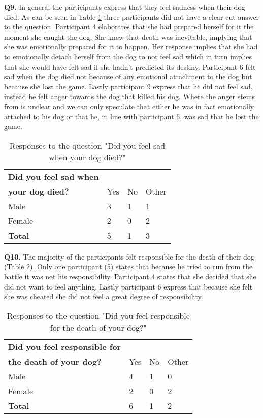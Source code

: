 \textbf{Q9.} In general the participants express that they feel sadness when their dog died. As can be seen in Table \ref{tab:sad} three participants did not have a clear cut answer to the question. Participant 4 elaborates that she had prepared herself for it the moment she caught the dog. She knew that death was inevitable, implying that she was emotionally prepared for it to happen. Her response implies that she had to emotionally detach herself from the dog to not feel sad which in turn implies that she would have felt sad if she hadn't predicted its destiny. Participant 6 felt sad when the dog died not because of any emotional attachment to the dog but because she lost the game. Lastly participant 9 express that he did not feel sad, instead he felt anger towards the dog that killed his dog. Where the anger stems from is unclear and we can only speculate that either he was in fact emotionally attached to his dog or that he, in line with participant 6, was sad that he lost the game.

\begin{table}[h]
\centering
\begin{tabular}{l l l l}
\hline
\textbf{Did you feel sad when}\\
\textbf{your dog died?} & Yes & No & Other \\
\hline
Male & 3 & 1 & 1 \\
Female & 2 & 0 & 2 \\
\textbf{Total} & 5 & 1 & 3 \\
\hline
\end{tabular}
\caption{\label{tab:sad}Responses to the question "Did you feel sad when your dog died?"}
\end{table}


\textbf{Q10.} The majority of the participants felt responsible for the death of their dog (Table \ref{tab:death}). Only one participant (5) states that because he tried to run from the battle it was not his responsibility. Participant 4 states that she decided that she did not want to feel anything. Lastly participant 6 express that because she felt she was cheated she did not feel a great degree of responsibility.

\begin{table}[h]
\centering
\begin{tabular}{l l l l}
\hline
\textbf{Did you feel responsible for}\\
\textbf{the death of your dog?} & Yes & No & Other \\
\hline
Male & 4 & 1 & 0 \\
Female & 2 & 0 & 2 \\
\textbf{Total} & 6 & 1 & 2 \\
\hline
\end{tabular}
\caption{\label{tab:death}Responses to the question "Did you feel responsible for the death of your dog?"}
\end{table}


